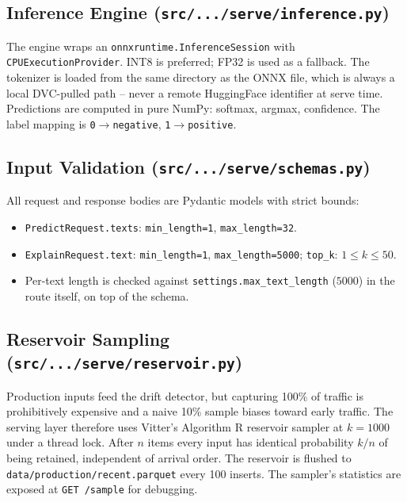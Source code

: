 \documentclass[11pt,a4paper]{article}
\begin{document}
\subsection{Inference Engine (\texttt{src/.../serve/inference.py})}

The engine wraps an \texttt{onnxruntime.InferenceSession} with
\texttt{CPUExecutionProvider}. INT8 is preferred; FP32 is used as a fallback. The
tokenizer is loaded from the same directory as the ONNX file, which is always a
local DVC-pulled path -- never a remote HuggingFace identifier at serve time.
Predictions are computed in pure NumPy: softmax, argmax, confidence. The label
mapping is \texttt{0$\rightarrow$negative}, \texttt{1$\rightarrow$positive}.

\subsection{Input Validation (\texttt{src/.../serve/schemas.py})}

All request and response bodies are Pydantic models with strict bounds:

\begin{itemize}[leftmargin=*]
\item \texttt{PredictRequest.texts}: \texttt{min\_length=1}, \texttt{max\_length=32}.
\item \texttt{ExplainRequest.text}: \texttt{min\_length=1}, \texttt{max\_length=5000};
      \texttt{top\_k}: $1 \leq k \leq 50$.
\item Per-text length is checked against \texttt{settings.max\_text\_length}
      ($5000$) in the route itself, on top of the schema.
\end{itemize}

\subsection{Reservoir Sampling (\texttt{src/.../serve/reservoir.py})}

Production inputs feed the drift detector, but capturing 100\% of traffic is
prohibitively expensive and a naive 10\% sample biases toward early traffic. The
serving layer therefore uses Vitter's Algorithm R reservoir sampler at $k=1000$
under a thread lock. After $n$ items every input has identical probability $k/n$ of
being retained, independent of arrival order. The reservoir is flushed to
\texttt{data/production/recent.parquet} every 100 inserts. The sampler's statistics
are exposed at \texttt{GET /sample} for debugging.
\end{document}

